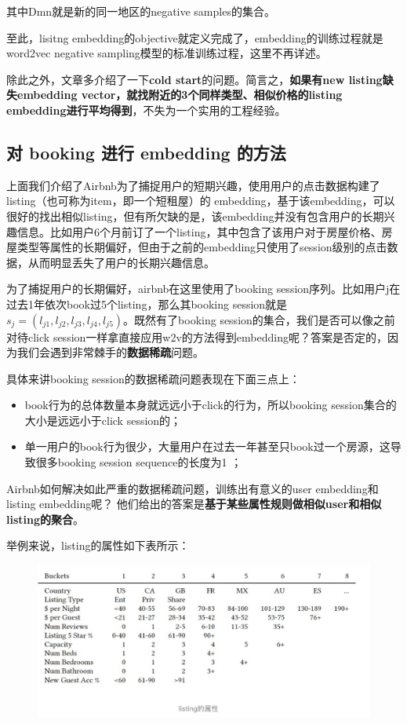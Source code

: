 \documentclass[12pt]{article}
\begin{document}
其中Dmn就是新的同一地区的negative samples的集合。

至此，lisitng embedding的objective就定义完成了，embedding的训练过程就是word2vec negative sampling模型的标准训练过程，这里不再详述。

除此之外，文章多介绍了一下\textbf{cold start}的问题。简言之，\textbf{如果有new listing缺失embedding vector，就找附近的3个同样类型、相似价格的listing embedding进行平均得到}，不失为一个实用的工程经验。

\subsection{对 booking 进行 embedding 的方法}
上面我们介绍了Airbnb为了捕捉用户的短期兴趣，使用用户的点击数据构建了listing（也可称为item，即一个短租屋）的 embedding，基于该embedding，可以很好的找出相似listing，但有所欠缺的是，该embedding并没有包含用户的长期兴趣信息。比如用户6个月前订了一个listing，其中包含了该用户对于房屋价格、房屋类型等属性的长期偏好，但由于之前的embedding只使用了session级别的点击数据，从而明显丢失了用户的长期兴趣信息。

为了捕捉用户的长期偏好，airbnb在这里使用了booking session序列。比如用户j在过去1年依次book过5个listing，那么其booking session就是$s_j = (l_{j1}, l_{j2}, l_{j3}, l_{j4}, l_{j5})$。既然有了booking session的集合，我们是否可以像之前对待click session一样拿直接应用w2v的方法得到embedding呢？答案是否定的，因为我们会遇到非常棘手的\textbf{数据稀疏}问题。

具体来讲booking session的数据稀疏问题表现在下面三点上：
\begin{itemize}
\setlength{\itemsep}{0pt}
\setlength{\parsep}{0pt}
\setlength{\parskip}{0pt}
    \item book行为的总体数量本身就远远小于click的行为，所以booking session集合的大小是远远小于click session的；
    \item 单一用户的book行为很少，大量用户在过去一年甚至只book过一个房源，这导致很多booking session sequence的长度为1
；
\end{itemize}

Airbnb如何解决如此严重的数据稀疏问题，训练出有意义的user embedding和listing embedding呢？
他们给出的答案是\textbf{基于某些属性规则做相似user和相似listing的聚合}。

举例来说，listing的属性如下表所示：
\begin{figure}[H]
    \centering
    \includegraphics[width=1\textwidth]{fig/Airbnb_Booking_Listing_Attrs.png}
\end{figure}
\end{document}
